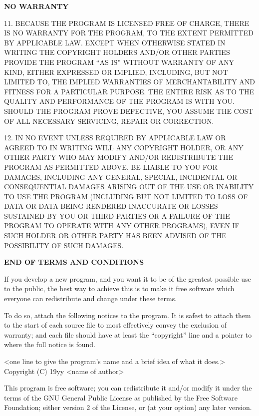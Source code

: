 \centerline{\bf NO WARRANTY}

\item{11.} {\fortran
BECAUSE THE PROGRAM IS LICENSED FREE OF CHARGE, THERE IS NO WARRANTY FOR
THE PROGRAM, TO THE EXTENT PERMITTED BY APPLICABLE LAW.  EXCEPT WHEN
OTHERWISE STATED IN WRITING THE COPYRIGHT HOLDERS AND/OR OTHER PARTIES
PROVIDE THE PROGRAM ``AS IS'' WITHOUT WARRANTY OF ANY KIND, EITHER
EXPRESSED OR IMPLIED, INCLUDING, BUT NOT LIMITED TO, THE IMPLIED
WARRANTIES OF MERCHANTABILITY AND FITNESS FOR A PARTICULAR PURPOSE.  THE
ENTIRE RISK AS TO THE QUALITY AND PERFORMANCE OF THE PROGRAM IS WITH
YOU.  SHOULD THE PROGRAM PROVE DEFECTIVE, YOU ASSUME THE COST OF ALL
NECESSARY SERVICING, REPAIR OR CORRECTION.
\endfortran}

\item{12.} {\fortran
IN NO EVENT UNLESS REQUIRED BY APPLICABLE LAW OR AGREED TO IN WRITING
WILL ANY COPYRIGHT HOLDER, OR ANY OTHER PARTY WHO MAY MODIFY AND/OR
REDISTRIBUTE THE PROGRAM AS PERMITTED ABOVE, BE LIABLE TO YOU FOR
DAMAGES, INCLUDING ANY GENERAL, SPECIAL, INCIDENTAL OR CONSEQUENTIAL
DAMAGES ARISING OUT OF THE USE OR INABILITY TO USE THE PROGRAM
(INCLUDING BUT NOT LIMITED TO LOSS OF DATA OR DATA BEING RENDERED
INACCURATE OR LOSSES SUSTAINED BY YOU OR THIRD PARTIES OR A FAILURE OF
THE PROGRAM TO OPERATE WITH ANY OTHER PROGRAMS), EVEN IF SUCH HOLDER OR
OTHER PARTY HAS BEEN ADVISED OF THE POSSIBILITY OF SUCH DAMAGES.
\endfortran}\medskip

\centerline{\bf END OF TERMS AND CONDITIONS}
\vfill\eject
{}

  If you develop a new program, and you want it to be of the greatest
possible use to the public, the best way to achieve this is to make it
free software which everyone can redistribute and change under these
terms.

  To do so, attach the following notices to the program.  It is safest
to attach them to the start of each source file to most effectively
convey the exclusion of warranty; and each file should have at least the
``copyright'' line and a pointer to where the full notice is found.

\fortran
 <one line to give the program's name and a brief idea of what it does.>
    Copyright (C) 19yy  <name of author>

    This program is free software; you can redistribute it and/or modify
    it under the terms of the GNU General Public License as published by
    the Free Software Foundation; either version 2 of the License, or
    (at your option) any later version.

